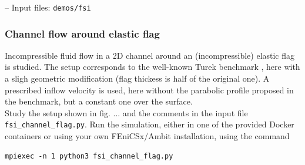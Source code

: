 \documentclass[a4paper,12pt]{report}
\begin{document}
-- Input files: \verb"demos/fsi"

\subsubsection*{Channel flow around elastic flag}

Incompressible fluid flow in a 2D channel around an (incompressible) elastic flag is studied. The setup corresponds to the well-known Turek benchmark \cite{turek2006}, here with a sligh geometric modification (flag thickess is half of the original one). A prescribed inflow velocity is used, here without the parabolic profile proposed in the benchmark, but a constant one over the surface.\\

Study the setup shown in fig. ... and the comments in the input file \verb"fsi_channel_flag.py". Run the simulation, either in one of the provided Docker containers or using your own FEniCSx/Ambit installation, using the command
\begin{verbatim}
mpiexec -n 1 python3 fsi_channel_flag.py
\end{verbatim}


\end{document}

